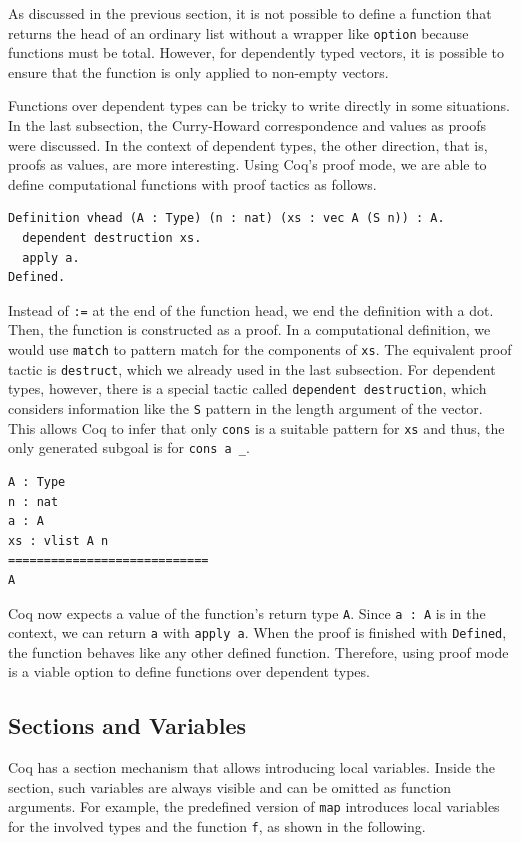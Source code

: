 \documentclass[a4paper, 11pt, fleqn, twoside]{scrreprt}
\newcommand{\cinl}[1]{\texttt{#1}}
\begin{document}
As discussed in the previous section, it is not possible to define a function that returns the head of an ordinary list without a wrapper like \cinl{option} because functions must be total.
However, for dependently typed vectors, it is possible to ensure that the function is only applied to non-empty vectors.

Functions over dependent types can be tricky to write directly in some situations.
In the last subsection, the Curry-Howard correspondence and values as proofs were discussed.
In the context of dependent types, the other direction, that is, proofs as values, are more interesting.
Using Coq's proof mode, we are able to define computational functions with proof tactics as follows.

\begin{verbatim}
Definition vhead (A : Type) (n : nat) (xs : vec A (S n)) : A.
  dependent destruction xs.
  apply a.
Defined.
\end{verbatim}

Instead of \cinl{:=} at the end of the function head, we end the definition with a dot.
Then, the function is constructed as a proof.
In a computational definition, we would use \cinl{match} to pattern match for the components of \cinl{xs}.
The equivalent proof tactic is \cinl{destruct}, which we already used in the last subsection.
For dependent types, however, there is a special tactic called \cinl{dependent destruction}, which considers information like the \cinl{S} pattern in the length argument of the vector.
This allows Coq to infer that only \cinl{cons} is a suitable pattern for \cinl{xs} and thus, the only generated subgoal is for \cinl{cons a _}.

\begin{verbatim}
A : Type
n : nat
a : A
xs : vlist A n
============================
A
\end{verbatim}

Coq now expects a value of the function's return type \cinl{A}.
Since \cinl{a : A} is in the context, we can return \cinl{a} with \cinl{apply a}.
When the proof is finished with \cinl{Defined}, the function behaves like any other defined function.
Therefore, using proof mode is a viable option to define functions over dependent types.

\subsection{Sections and Variables}
Coq has a section mechanism that allows introducing local variables.
Inside the section, such variables are always visible and can be omitted as function arguments.
For example, the predefined version of \cinl{map} introduces local variables for the involved types and the function \cinl{f}, as shown in the following.
\end{document}
